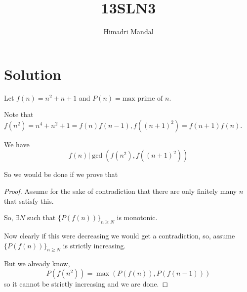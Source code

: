 \documentclass[11pt]{scrartcl}
\title{13SLN3}
\author{Himadri Mandal}
\begin{document}
\maketitle

\section{Solution}
\begin{soln}
\raggedright
Let $f(n)=n^2 + n + 1$ and $P(n) = \text{max prime of } n$. 

Note that $f(n^2) = n^4+n^2+1 = f(n)f(n-1), f((n+1)^2) = f(n+1)f(n)$.

We have $$f(n)|\gcd(f(n^2),f((n+1)^2))$$

So we would be done if we prove that
\begin{claim}
	There exist infinitely many $n$ such that $$P(f(n-1)) \leq P(f(n)) \geq P(f(n+1))$$
}
\end{claim}
\begin{proof}
	Assume for the sake of contradiction that there are only finitely many $n$ that satisfy this.

	So, $\exists N$ such that $\{P(f(n))\}_{n\geq N}$ is monotonic.

	Now clearly if this were decreasing we would get a contradiction, so, assume $\{P(f(n))\}_{n\geq N}$ is strictly increasing. 

	\newline

	But we already know, $$P(f(n^2)) = \max(P(f(n)),P(f(n-1)))$$ so it cannot be strictly increasing and we are done. 
\end{proof}
\end{soln}
\end{document}
